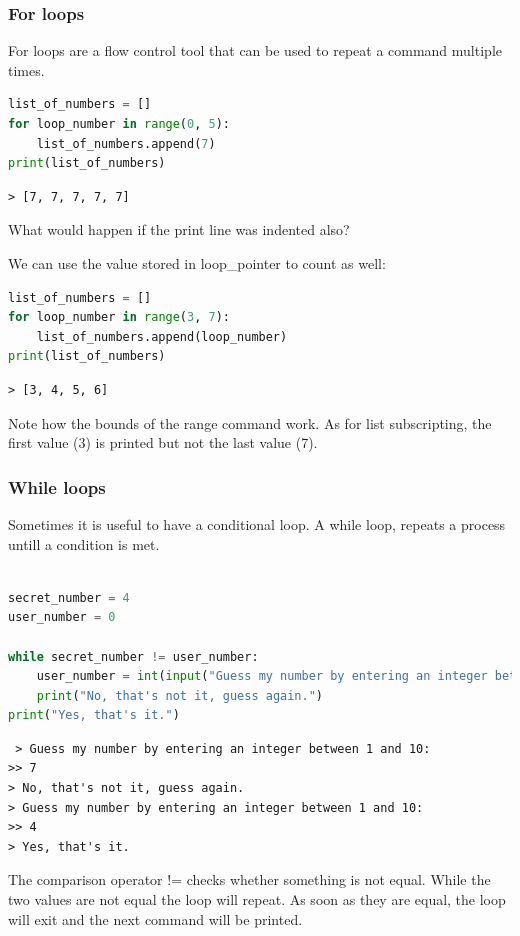 		\subsubsection{For loops}
		For loops are a flow control tool that can be used to repeat a command multiple times.
		\begin{lstlisting}[language=Python]
list_of_numbers = []
for loop_number in range(0, 5):
	list_of_numbers.append(7)
print(list_of_numbers)\end{lstlisting}
		\begin{verbatim}> [7, 7, 7, 7, 7]\end{verbatim}

		\begin{task}What would happen if the print line was indented also?\end{task}
		We can use the value stored in loop\_pointer to count as well:
		\begin{lstlisting}[language=Python]
list_of_numbers = []
for loop_number in range(3, 7):
	list_of_numbers.append(loop_number)
print(list_of_numbers)\end{lstlisting}
\begin{verbatim}> [3, 4, 5, 6]\end{verbatim}

Note how the bounds of the range command work. As for list subscripting, the first value (3) is printed but not the last value (7).

		\subsubsection{While loops}
		Sometimes it is useful to have a conditional loop. A while loop, repeats a process untill a condition is met.
\begin{lstlisting}[language=Python]

secret_number = 4
user_number = 0

while secret_number != user_number:
	user_number = int(input("Guess my number by entering an integer between 1 and 10: "
	print("No, that's not it, guess again.")
print("Yes, that's it.")\end{lstlisting}
		\begin{verbatim} > Guess my number by entering an integer between 1 and 10: 
>> 7
> No, that's not it, guess again.
> Guess my number by entering an integer between 1 and 10:
>> 4
> Yes, that's it.\end{verbatim}
		The comparison operator != checks whether something is not equal. While the two values are not equal the loop will repeat. As soon as they are equal, the loop will exit and the next command will be printed.


